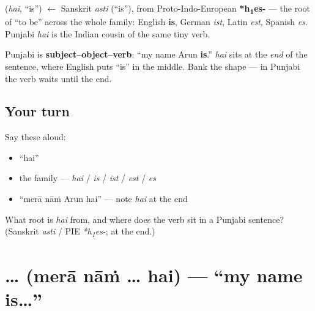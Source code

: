 \begin{cousinweb}
\textbf{} (\emph{hai}, \textquotedblleft{}is\textquotedblright{}) $\leftarrow$ Sanskrit \emph{asti} (\textquotedblleft{}is\textquotedblright{}), from Proto-Indo-European \textbf{*h\textsubscript{1}es-} — the root of \textquotedblleft{}to be\textquotedblright{} across the whole family: English \textbf{is}, German \emph{ist}, Latin \emph{est}, Spanish \emph{es}. Punjabi \emph{hai} is the Indian cousin of the same tiny verb.
\end{cousinweb}

\begin{grammarlens}[title={Grammar Lens: the verb comes last}]
Punjabi is \textbf{subject–object–verb}: \textquotedblleft{}my name Arun \textbf{is}.\textquotedblright{} \emph{hai} sits at the \emph{end} of the sentence, where English puts \textquotedblleft{}is\textquotedblright{} in the middle. Bank the shape — in Punjabi the verb waits until the end.
\end{grammarlens}

\subsection*{Your turn}
Say these aloud:

\begin{itemize}
\raggedright
  \item \textquotedblleft{}hai\textquotedblright{}
  \item the family — \emph{hai} / \emph{is} / \emph{ist} / \emph{est} / \emph{es}
  \item \textquotedblleft{}merā nāṁ Arun hai\textquotedblright{} — note \emph{hai} at the end
\end{itemize}

\begin{tcolorbox}[breakable,colback=teal!4,colframe=teal!35!black,title={Before you move on}]
What root is \emph{hai} from, and where does the verb sit in a Punjabi sentence? (Sanskrit \emph{asti} / PIE \emph{*h\textsubscript{1}es-}; at the end.)
\end{tcolorbox}
\section[\texorpdfstring{\pa{ਮੇਰਾ} \pa{ਨਾਂ} … \pa{ਹੈ} (merā nāṁ … hai)}{ਮੇਰਾ ਨਾਂ … ਹੈ (merā nāṁ … hai)}]{  …  (merā nāṁ … hai) — \textquotedblleft{}my name is…\textquotedblright{}}

\label{lesson:PA-C02-mera-naam-hai}



